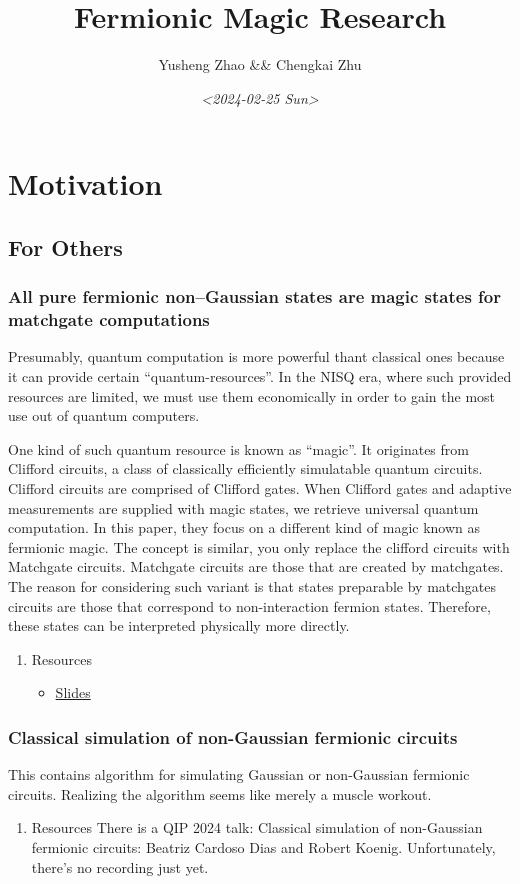 \documentclass[11pt]{article}
\author{Yusheng Zhao \&\& Chengkai Zhu}
\date{\textit{<2024-02-25 Sun>}}
\title{Fermionic Magic Research}
\begin{document}
\maketitle
\tableofcontents

\section{Motivation}
\label{sec:org14c52af}
\subsection{For Others}
\label{sec:orgd051d34}
\subsubsection{All pure fermionic non–Gaussian states are magic states for matchgate computations}
\label{sec:orgf222898}
Presumably, quantum computation is more powerful thant classical ones because it
can provide certain ``quantum-resources''. In the NISQ era, where such provided
resources are limited, we must use them economically in order to gain the most
use out of quantum computers.

One kind of such quantum resource is known as ``magic''. It originates from
Clifford circuits, a class of classically efficiently simulatable quantum
circuits. Clifford circuits are comprised of Clifford gates. When Clifford gates
and adaptive measurements are supplied with magic states, we retrieve universal
quantum computation. In this paper, they focus on a different kind of magic
known as fermionic magic. The concept is similar, you only replace the clifford
circuits with Matchgate circuits. Matchgate circuits are those that are created
by matchgates. The reason for considering such variant is that states preparable
by matchgates circuits are those that correspond to non-interaction fermion
states. Therefore, these states can be interpreted physically more directly.
\begin{enumerate}
\item Resources
\label{sec:orgc29793a}
\begin{itemize}
\item \href{http://www.physics.usyd.edu.au/quantum/Coogee2020/Presentations/Jozsa.pdf}{Slides}
\end{itemize}
\end{enumerate}
\subsubsection{Classical simulation of non-Gaussian fermionic circuits}
\label{sec:org734544c}
This contains algorithm for simulating Gaussian or non-Gaussian fermionic
circuits. Realizing the algorithm seems like merely a muscle workout.
\begin{enumerate}
\item Resources
\label{sec:org42b7556}
There is a QIP 2024 talk: Classical simulation of non-Gaussian fermionic
circuits: Beatriz Cardoso Dias and Robert Koenig. Unfortunately, there's no
recording just yet.
\end{enumerate}
\end{document}
